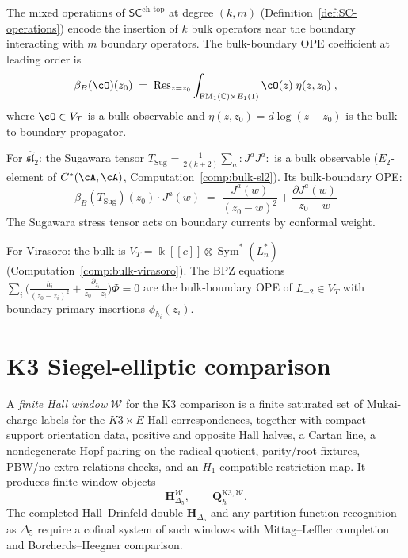 \begin{construction}
\label{constr:bulk-boundary-ope}
The mixed operations of $\mathsf{SC}^{\mathrm{ch,top}}$ at
degree $(k,m)$ (Definition~\ref{def:SC-operations}) encode the
insertion of $k$ bulk operators near the boundary interacting
with $m$ boundary operators. The bulk-boundary OPE coefficient
at leading order is
\[
\beta_B(\cO)(z_0)
\;=\;
\operatorname{Res}_{z=z_0}
\int_{\mathrm{FM}_1(\mathbb C)\times E_1(1)}
\cO(z)\;\eta(z,z_0)\;,
\]
where $\cO\in V_T$ is a bulk observable and
$\eta(z,z_0)=d\log(z-z_0)$ is the bulk-to-boundary
propagator.

For $\widehat{\mathfrak{sl}}_2$: the Sugawara tensor
$T_{\mathrm{Sug}}=\frac{1}{2(k+2)}\sum_a{:}J^a J^a{:}$
is a bulk observable ($E_2$-element of $C^*(\cA,\cA)$,
Computation~\ref{comp:bulk-sl2}). Its bulk-boundary OPE:
\[
\beta_B(T_{\mathrm{Sug}})(z_0)\cdot J^a(w)
\;=\;
\frac{J^a(w)}{(z_0-w)^2}+\frac{\partial J^a(w)}{z_0-w}
\]
The Sugawara stress tensor acts on boundary currents by
conformal weight.

For Virasoro: the bulk is $V_T=\Bbbk[[c]]\otimes
\operatorname{Sym}^*(L_n^*)$
(Computation~\ref{comp:bulk-virasoro}). The BPZ equations
$\sum_i\bigl(\frac{h_i}{(z_0-z_i)^2}
+\frac{\partial_{z_i}}{z_0-z_i}\bigr)\Phi=0$
are the bulk-boundary OPE of $L_{-2}\in V_T$ with boundary
primary insertions $\phi_{h_i}(z_i)$.
\end{construction}

\section{K3 Siegel-elliptic comparison}
\label{sec:mpvaq-supplement}

\begin{definition}
\label{def:mpvaq-finite-hall-window}
A \emph{finite Hall window} $\mathcal W$ for the K3 comparison is a
finite saturated set of Mukai-charge labels for the $K3\times E$ Hall
correspondences, together with compact-support orientation data, positive
and opposite Hall halves, a Cartan line, a nondegenerate Hopf pairing on
the radical quotient, parity/root fixtures, PBW/no-extra-relations checks,
and an $H_1$-compatible restriction map.  It produces finite-window
objects
\[
\mathbf H_{\Delta_5}^{\mathcal W},
\qquad
\mathbf Q_{\hbar}^{\mathrm{K3},\mathcal W}.
\]
The completed Hall--Drinfeld double $\mathbf H_{\Delta_5}$ and any
partition-function recognition as $\Delta_5$ require a cofinal system of
such windows with Mittag--Leffler completion and Borcherds--Heegner
comparison.
\end{definition}

